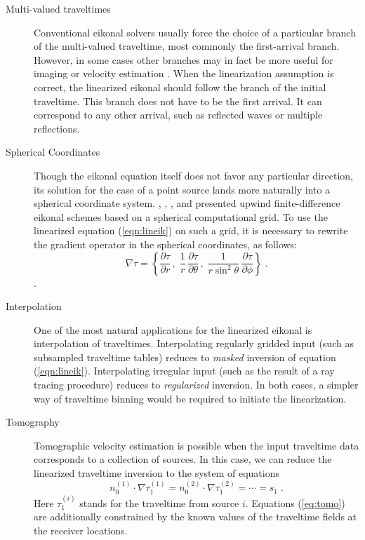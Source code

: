 \begin{description}
\item[Multi-valued traveltimes] Conventional eikonal solvers usually
  force the choice of a particular branch of the multi-valued
  traveltime, most commonly the first-arrival branch. However, in some
  cases other branches may in fact be more useful for imaging or
  velocity estimation \cite[]{gray}. When the linearization assumption
  is correct, the linearized eikonal should follow the branch of the
  initial traveltime. This branch does not have to be the first
  arrival.  It can correspond to any other arrival, such as reflected
  waves or multiple reflections.
  
\item[Spherical Coordinates] Though the eikonal equation itself does
  not favor any particular direction, its solution for the case of a
  point source lands more naturally into a spherical coordinate
  system.  \cite{GEO56-06-08120821},
  \cite{Popovici.sep.70.245}, \cite{SEG-1994-1394}, and
  \cite{schneider} presented upwind finite-difference eikonal
  schemes based on a spherical computational grid. To use the
  linearized equation (\ref{eqn:lineik}) on such a grid, it is necessary to
  rewrite the gradient operator in the spherical coordinates, as
  follows:
  \[
  \nabla \tau = \left\{
    \frac{\partial \tau}{\partial r}\,,\;
    \frac{1}{r}\,\frac{\partial \tau}{\partial \theta}\,,\;
    \frac{1}{r \sin^2 \theta}\,\frac{\partial \tau}{\partial \phi}\right\}\;.
\].

\item[Interpolation] One of the most natural applications for the
  linearized eikonal is interpolation of traveltimes. Interpolating
  regularly gridded input (such as subsampled traveltime tables)
  reduces to \emph{masked} inversion of equation (\ref{eqn:lineik}).
  Interpolating irregular input (such as the result of a ray tracing
  procedure) reduces to \emph{regularized} inversion. In both cases, a
  simpler way of traveltime binning would be required to initiate the
  linearization.
  
\item[Tomography] Tomographic velocity estimation is possible when the
  input traveltime data corresponds to a collection of sources. In
  this case, we can reduce the linearized traveltime inversion to the
  system of equations
  \begin{equation}
    \label{eq:tomo}
    n_0^{(1)} \cdot \nabla \tau_1^{(1)} =
    n_0^{(2)} \cdot \nabla \tau_1^{(2)} =
    \cdots = s_1\;.
  \end{equation}
  Here $\tau_1^{(i)}$ stands for the traveltime from source $i$.
  Equations (\ref{eq:tomo}) are additionally constrained by the known
  values of the traveltime fields at the receiver locations.
  

\end{description}
